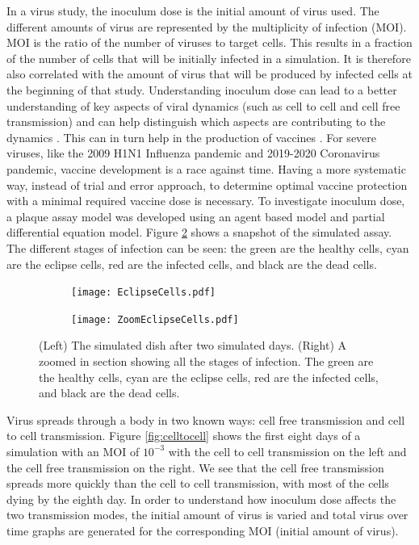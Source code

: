 \documentclass[a4paper]{article}
\begin{document}
In a virus study, the inoculum dose is the initial amount of virus used. The different amounts of virus are represented by the multiplicity of infection (MOI). MOI is the ratio of the number of viruses to target cells. This results in a fraction of the number of cells that will be initially infected in a simulation. It is therefore also correlated with the amount of virus that will be produced by infected cells at the beginning of that study. Understanding inoculum dose can lead to a better understanding of key aspects of viral dynamics \cite{Li} (such as cell to cell and cell free transmission) and can help distinguish which aspects are contributing to the dynamics \cite{Moore}. This can in turn help in the production of vaccines \cite{Li}. For severe viruses, like the 2009 H1N1 Influenza pandemic and 2019-2020 Coronavirus pandemic, vaccine development is a race against time. Having a more systematic way, instead of trial and error approach, to determine optimal vaccine protection with a minimal required vaccine dose is necessary. To investigate inoculum dose, a plaque assay model was developed using an agent based model and partial differential equation model. Figure \ref{fig:ZoomedInEclipse} shows a snapshot of the simulated assay. The different stages of infection can be seen: the green are the healthy cells, cyan are the eclipse cells, red are the infected cells, and black are the dead cells.

%

\begin{figure}[h]
    \centering
    \begin{subfigure}[b]{0.4\linewidth}
        \texttt{[image: EclipseCells.pdf]}
        \caption{}
        \label{fig:Dish}
    \end{subfigure}
    \begin{subfigure}[b]{0.4\linewidth}
        \texttt{[image: ZoomEclipseCells.pdf]}
        \caption{}
        \label{fig:ZoomedInEclipse}
    \end{subfigure}
    \caption{(Left) The simulated dish after two simulated days. (Right) A zoomed in section showing all the stages of infection. The green are the healthy cells, cyan are the eclipse cells, red are the infected cells, and black are the dead cells.}
    \label{fig:EclipseCells}
\end{figure}

Virus spreads through a body in two known ways: cell free transmission and cell to cell transmission. Figure \ref{fig:celltocell} shows the first eight days of a simulation with an MOI of $10^{-3}$ with the cell to cell transmission on the left and the cell free transmission on the right. We see that the cell free transmission spreads more quickly than the cell to cell transmission, with most of the cells dying by the eighth day. In order to understand how inoculum dose affects the two transmission modes, the initial amount of virus is varied and total virus over time graphs are generated for the corresponding MOI (initial amount of virus).
\end{document}
